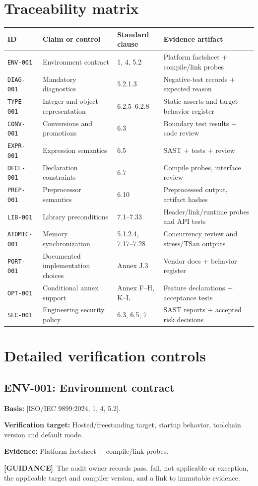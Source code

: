 \documentclass[10pt,letterpaper,oneside]{report}
\newcommand{\refcl}[1]{\textsf{\footnotesize[ISO/IEC 9899:2024, #1]}}
\newcommand{\guidance}{\textbf{[GUIDANCE]}}
\begin{document}
\chapter{Traceability matrix}
\scriptsize\begin{longtable}{p{.13\linewidth}p{.26\linewidth}p{.17\linewidth}p{.34\linewidth}}\toprule ID & Claim or control & Standard clause & Evidence artifact\\\midrule\endhead
\texttt{ENV-001} & Environment contract & 1, 4, 5.2 & Platform factsheet + compile/link probes\\\hline
\texttt{DIAG-001} & Mandatory diagnostics & 5.2.1.3 & Negative-test records + expected reason\\\hline
\texttt{TYPE-001} & Integer and object representation & 6.2.5--6.2.8 & Static asserts and target behavior register\\\hline
\texttt{CONV-001} & Conversions and promotions & 6.3 & Boundary test results + code review\\\hline
\texttt{EXPR-001} & Expression semantics & 6.5 & SAST + tests + review\\\hline
\texttt{DECL-001} & Declaration constraints & 6.7 & Compile probes, interface review\\\hline
\texttt{PREP-001} & Preprocessor semantics & 6.10 & Preprocessed output, artifact hashes\\\hline
\texttt{LIB-001} & Library preconditions & 7.1--7.33 & Header/link/runtime probes and API tests\\\hline
\texttt{ATOMIC-001} & Memory synchronization & 5.1.2.4, 7.17--7.28 & Concurrency review and stress/TSan outputs\\\hline
\texttt{PORT-001} & Documented implementation choices & Annex J.3 & Vendor docs + behavior register\\\hline
\texttt{OPT-001} & Conditional annex support & Annex F--H, K--L & Feature declarations + acceptance tests\\\hline
\texttt{SEC-001} & Engineering security policy & 6.3, 6.5, 7 & SAST reports + accepted risk decisions\\\hline
\bottomrule\end{longtable}\normalsize
\chapter{Detailed verification controls}
\section{ENV-001: Environment contract}
\textbf{Basis:} \refcl{1, 4, 5.2}.\par\textbf{Verification target:} Hosted/freestanding target, startup behavior, toolchain version and default mode.\par\textbf{Evidence:} Platform factsheet + compile/link probes.\par\guidance\ The audit owner records pass, fail, not applicable or exception, the applicable target and compiler version, and a link to immutable evidence.
\end{document}
